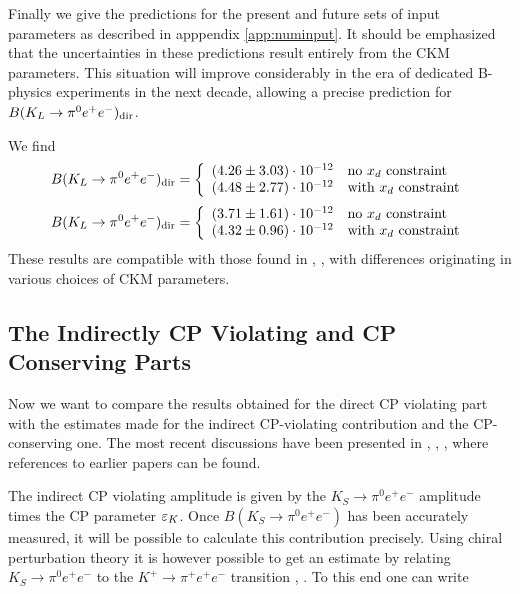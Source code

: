 Finally we give the predictions for the present and future sets of
input parameters as described in apppendix \ref{app:numinput}. It
should be  emphasized that the uncertainties in these predictions
result entirely from the CKM parameters. This situation will improve
considerably in the era of dedicated B-physics experiments in the
next decade, allowing a precise prediction for $B(K_L \to \pi^0
e^+e^-)_{\rm dir}$.

We find
\begin{equation}
B(K_L \to \pi^0 e^+ e^-)_{\rm dir}=
\left\{\begin{array}{ll}
(4.26 \pm 3.03) \cdot 10^{-12} & \mbox{no $x_d$ constraint} \\
(4.48 \pm 2.77) \cdot 10^{-12} & \mbox{with $x_d$ constraint} 
\end{array} \right.
\label{eq:BKLdirpresent}
\end{equation}
\begin{equation}
B(K_L \to \pi^0 e^+ e^-)_{\rm dir}=
\left\{\begin{array}{ll}
(3.71 \pm 1.61) \cdot 10^{-12} & \mbox{no $x_d$ constraint} \\
(4.32 \pm 0.96) \cdot 10^{-12} & \mbox{with $x_d$ constraint}
\end{array} \right.
\label{eq:BKLdirfuture}
\end{equation}
These results are compatible with those found in \cite{burasetal:94a},
\cite{donoghuegabbiani:95}, \cite{kohlerpaschos:95} with differences
originating in various choices of CKM parameters.


\subsection{The Indirectly CP Violating and CP Conserving Parts}
            \label{sec:KLpee:Comparison}
Now we want to compare the results obtained for the direct CP violating
part with the estimates made for the indirect CP-violating contribution
and the CP-conserving one. The most recent discussions have been
presented in \cite{cohenetal:93}, \cite{heiligerseghal:93},
\cite{donoghuegabbiani:95}, \cite{kohlerpaschos:95} where references to
earlier papers can be found.

The indirect CP violating amplitude is given by the
$K_S \to \pi^0 e^+ e^-$ amplitude times the CP parameter $\varepsilon_K$.
Once $B(K_S \to \pi^0 e^+ e^-)$ has been accurately measured, it will
be possible to calculate this contribution precisely. Using chiral
perturbation theory it is however possible to get an estimate by
relating $K_S \to \pi^0 e^+ e^-$ to the $K^+ \to \pi^+ e^+ e^-$
transition \cite{eckeretal:87}, \cite{eckeretal:88}. To this end one
can write 

